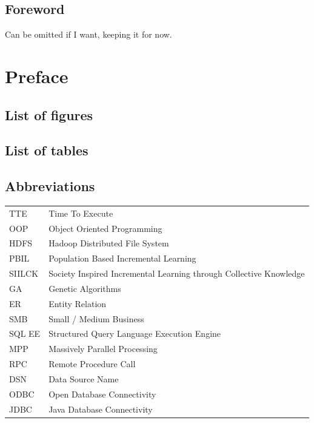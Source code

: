 \documentclass[a4paper,english]{report}
\begin{document}
	\pagebreak
	\section{Foreword}
	Can be omitted if I want, keeping it for now.
	
	\tableofcontents
	
	\chapter{Preface}
	\section{List of figures}
	\section{List of tables}
	\section{Abbreviations}
	\label{word_list}
	\begin{table}[h]
		\centering
		\begin{tabular}{ll}
			TTE	& Time To Execute \\
			OOP	& Object Oriented Programming \\
			HDFS & Hadoop Distributed File System \\
			PBIL & Population Based Incremental Learning \\
			SIILCK & Society Inspired Incremental Learning through Collective Knowledge \\
			GA & Genetic Algorithms \\
			ER & Entity Relation \\
			SMB & Small / Medium Business \\
			SQL EE & Structured Query Language Execution Engine \\
			MPP & Massively Parallel Processing \\
			RPC & Remote Procedure Call \\
			DSN & Data Source Name \\
			ODBC & Open Database Connectivity \\
			JDBC & Java Database Connectivity \\
		\end{tabular}
	\end{table}
\end{document}
